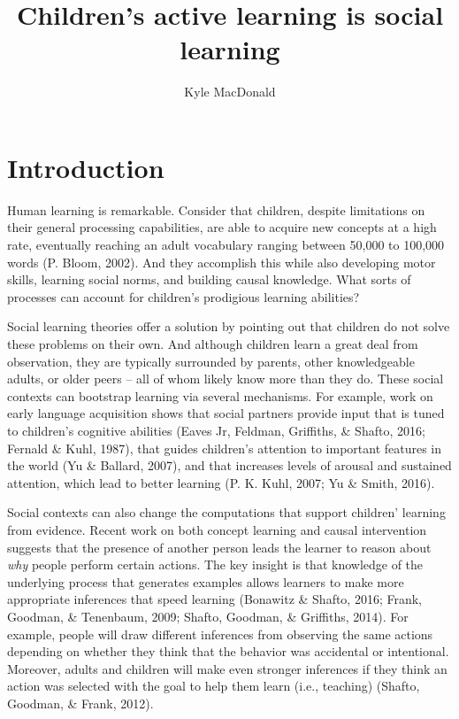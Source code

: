 \documentclass[a4paper,man,apacite,floatsintext]{apa6}
\date{}
\title{\textbf{Children's active learning is social learning}}
\author{Kyle MacDonald}
\affiliation{Department of Psychology, Stanford University}
\begin{document}
\maketitle

\section{Introduction}\label{introduction}

Human learning is remarkable. Consider that children, despite
limitations on their general processing capabilities, are able to
acquire new concepts at a high rate, eventually reaching an adult
vocabulary ranging between 50,000 to 100,000 words (P. Bloom, 2002). And
they accomplish this while also developing motor skills, learning social
norms, and building causal knowledge. What sorts of processes can
account for children's prodigious learning abilities?

Social learning theories offer a solution by pointing out that children
do not solve these problems on their own. And although children learn a
great deal from observation, they are typically surrounded by parents,
other knowledgeable adults, or older peers -- all of whom likely know
more than they do. These social contexts can bootstrap learning via
several mechanisms. For example, work on early language acquisition
shows that social partners provide input that is tuned to children's
cognitive abilities (Eaves Jr, Feldman, Griffiths, \& Shafto, 2016;
Fernald \& Kuhl, 1987), that guides children's attention to important
features in the world (Yu \& Ballard, 2007), and that increases levels
of arousal and sustained attention, which lead to better learning (P. K.
Kuhl, 2007; Yu \& Smith, 2016).

Social contexts can also change the computations that support children'
learning from evidence. Recent work on both concept learning and causal
intervention suggests that the presence of another person leads the
learner to reason about \emph{why} people perform certain actions. The
key insight is that knowledge of the underlying process that generates
examples allows learners to make more appropriate inferences that speed
learning (Bonawitz \& Shafto, 2016; Frank, Goodman, \& Tenenbaum, 2009;
Shafto, Goodman, \& Griffiths, 2014). For example, people will draw
different inferences from observing the same actions depending on
whether they think that the behavior was accidental or intentional.
Moreover, adults and children will make even stronger inferences if they
think an action was selected with the goal to help them learn (i.e.,
teaching) (Shafto, Goodman, \& Frank, 2012).
\end{document}

